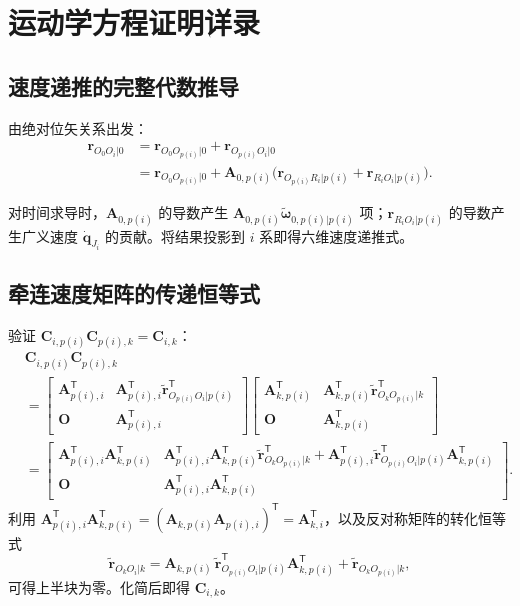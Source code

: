 \documentclass[10pt,a4paper]{book}
\theoremstyle{thmstyle}
\theoremstyle{defstyle}
\theoremstyle{prostyle}
\newcommand{\T}{^{\mathsf{T}}}
\renewcommand{\vec}[1]{\bm{#1}}
\newcommand{\mat}[1]{\bm{#1}}
\newcommand{\tildev}[1]{\tilde{#1}}
\begin{document}
\section{运动学方程证明详录}

\subsection{速度递推的完整代数推导}

由绝对位矢关系出发：
\begin{align}
\vec{r}_{O_0O_i|0} &= \vec{r}_{O_0O_{p(i)}|0} + \vec{r}_{O_{p(i)}O_i|0} \\
&= \vec{r}_{O_0O_{p(i)}|0} + \mat{A}_{0,p(i)}\bigl(\vec{r}_{O_{p(i)}R_i|p(i)} + \vec{r}_{R_iO_i|p(i)}\bigr).
\end{align}

对时间求导时，$\mat{A}_{0,p(i)}$ 的导数产生 $\mat{A}_{0,p(i)}\tildev{\vec{\omega}}_{0,p(i)|p(i)}$ 项；$\vec{r}_{R_iO_i|p(i)}$ 的导数产生广义速度 $\dot{\vec{q}}_{J_i}$ 的贡献。将结果投影到 $i$ 系即得六维速度递推式。

\subsection{牵连速度矩阵的传递恒等式}

验证 $\mat{C}_{i,p(i)}\mat{C}_{p(i),k} = \mat{C}_{i,k}$：
\begin{align*}
&\mat{C}_{i,p(i)}\mat{C}_{p(i),k} \\
&= \begin{bmatrix}
\mat{A}_{p(i),i}\T & \mat{A}_{p(i),i}\T\tildev{\vec{r}}_{O_{p(i)}O_i|p(i)}\T \\
\mat{O} & \mat{A}_{p(i),i}\T
\end{bmatrix}
\begin{bmatrix}
\mat{A}_{k,p(i)}\T & \mat{A}_{k,p(i)}\T\tildev{\vec{r}}_{O_kO_{p(i)}|k}\T \\
\mat{O} & \mat{A}_{k,p(i)}\T
\end{bmatrix} \\
&= \begin{bmatrix}
\mat{A}_{p(i),i}\T\mat{A}_{k,p(i)}\T
& \mat{A}_{p(i),i}\T\mat{A}_{k,p(i)}\T\tildev{\vec{r}}_{O_kO_{p(i)}|k}\T
+ \mat{A}_{p(i),i}\T\tildev{\vec{r}}_{O_{p(i)}O_i|p(i)}\T\mat{A}_{k,p(i)}\T \\
\mat{O} & \mat{A}_{p(i),i}\T\mat{A}_{k,p(i)}\T
\end{bmatrix}.
\end{align*}
利用 $\mat{A}_{p(i),i}\T\mat{A}_{k,p(i)}\T = (\mat{A}_{k,p(i)}\mat{A}_{p(i),i})\T = \mat{A}_{k,i}\T$，以及反对称矩阵的转化恒等式
\[
\tildev{\vec{r}}_{O_kO_i|k} = \mat{A}_{k,p(i)}\,\tildev{\vec{r}}_{O_{p(i)}O_i|p(i)}\T\mat{A}_{k,p(i)}\T
+ \tildev{\vec{r}}_{O_kO_{p(i)}|k},
\]
可得上半块为零。化简后即得 $\mat{C}_{i,k}$。
\end{document}
